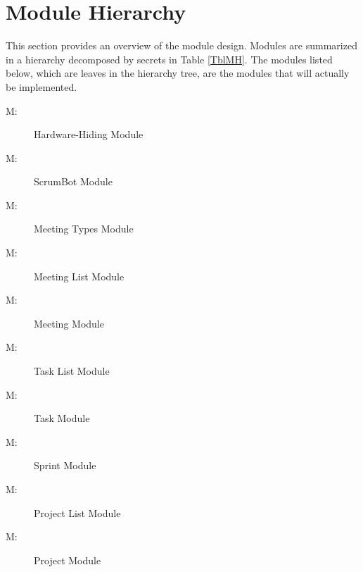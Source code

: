 \documentclass[12pt, titlepage]{article}
\newcounter{mnum}
\newcommand{\mthemnum}{M\themnum}
\begin{document}
\section{Module Hierarchy} \label{SecMH}
This section provides an overview of the module design. Modules are summarized
in a hierarchy decomposed by secrets in Table \ref{TblMH}. The modules listed
below, which are leaves in the hierarchy tree, are the modules that will
actually be implemented.

\begin{description}
    \item [ \mthemnum \label{m1}:] Hardware-Hiding Module
    \item [ \mthemnum \label{m2}:] ScrumBot Module
    \item [ \mthemnum \label{m3}:] Meeting Types Module
    \item [ \mthemnum \label{m4}:] Meeting List Module
    \item [ \mthemnum \label{m5}:] Meeting Module
    \item [ \mthemnum \label{m6}:] Task List Module
    \item [ \mthemnum \label{m7}:] Task Module
    \item [ \mthemnum \label{m8}:] Sprint Module
    \item [ \mthemnum \label{m9}:] Project List Module
    \item [ \mthemnum \label{m10}:] Project Module
\end{description}
\end{document}

